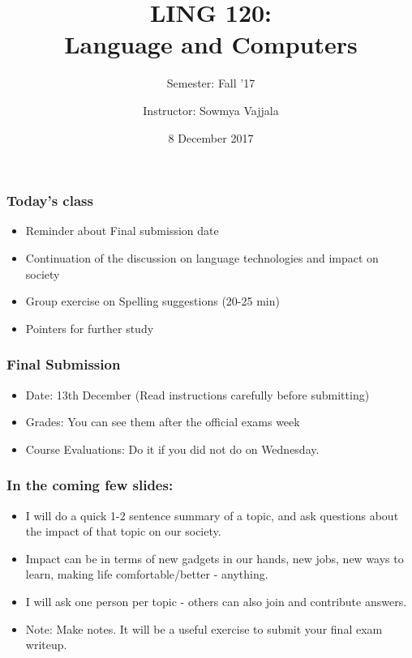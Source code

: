 \documentclass{beamer}
\author[Sowmya Vajjala]{Instructor: Sowmya Vajjala}
\title[LING 120]{LING 120: \\ Language and Computers}
\subtitle{Semester: Fall '17}
\date{8 December 2017}
\institute{Iowa State University, USA}
\begin{document}
\begin{frame}\titlepage
\end{frame}


\begin{frame}
\frametitle{Today's class}
\begin{itemize}
\item Reminder about Final submission date
\item Continuation of the discussion on language technologies and impact on society
\item Group exercise on Spelling suggestions (20-25 min)
\item Pointers for further study
\end{itemize}
\end{frame}

\begin{frame}
\frametitle{Final Submission}
\begin{itemize}
\item Date: 13th December (Read instructions carefully before submitting)
\item Grades: You can see them after the official exams week
\item Course Evaluations: Do it if you did not do on Wednesday. 
\end{itemize}
\end{frame}

\begin{frame}
\frametitle{In the coming few slides: }
\begin{itemize}
\item I will do a quick 1-2 sentence summary of a topic, and ask questions about the impact of that topic on our society.
\item Impact can be in terms of new gadgets in our hands, new jobs, new ways to learn, making life comfortable/better - anything.
\item I will ask one person per topic - others can also join and contribute answers.
\item Note: Make notes. It will be a useful exercise to submit your final exam writeup.
\end{itemize}
\end{frame}
\end{document}

